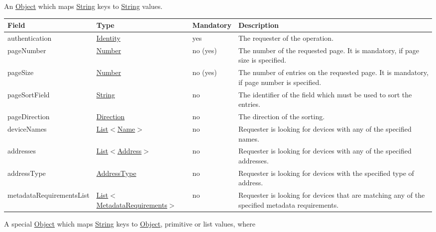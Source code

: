 \documentclass[a4paper]{arrowhead}
\newcommand{\pref}[1]{{\textcolor{ArrowheadGrey}{\hyperref[sec:model:primitives:#1]{#1}}}}
\begin{document}
An \pref{Object} which maps \pref{String} keys to \pref{String} values.

\clearpage

\label{sec:model:DeviceQueryRequest}

\begin{table}[ht!]
\begin{tabularx}{\textwidth}{| p{4.1cm} | p{4.8cm} | p{2cm} | X |} \hline
\rowcolor{gray!33} Field & Type & Mandatory & Description \\ \hline
authentication & \hyperref[sec:model:Identity]{Identity} & yes & The requester of the operation. \\ \hline
pageNumber & \pref{Number} & no (yes) & The number of the requested page. It is mandatory, if page size is specified. \\ \hline
pageSize & \pref{Number} & no (yes) & The number of entries on the requested page. It is mandatory, if page number is specified. \\ \hline
pageSortField & \pref{String} & no & The identifier of the field which must be used to sort the entries. \\ \hline
pageDirection & \pref{Direction} & no & The direction of the sorting. \\ \hline
deviceNames &  \pref{List}$<$\pref{Name}$>$ & no & Requester is looking for devices with any of the specified names. \\ \hline
addresses &  \pref{List}$<$\pref{Address}$>$ & no & Requester is looking for devices with any of the specified add\-resses.   \\ \hline
addressType &  \pref{AddressType} & no & Requester is looking for devices with the specified type of address. \\ \hline
metadataRequirementsList & \pref{List}$<$\hyperref[sec:model:MetadataRequirements]{MetadataRequirements}$>$ & no & Requester is looking for devices that are matching any of the specified metadata requirements. \\ \hline
\end{tabularx}
\end{table}

\label{sec:model:MetadataRequirements}

A special \pref{Object} which maps \pref{String} keys to \pref{Object}, primitive or list values, where 
\end{document}
